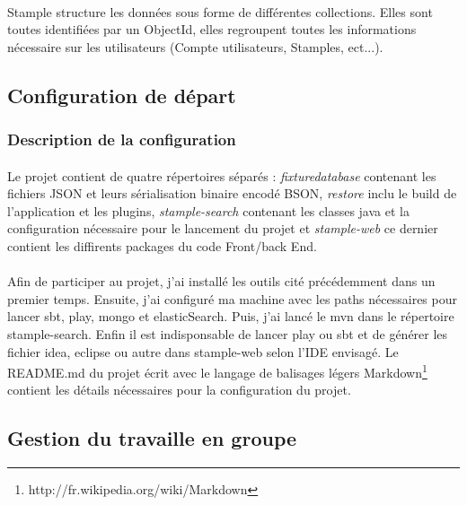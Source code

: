 \paragraph{}
Stample structure les données sous forme de différentes collections.
Elles sont toutes identifiées par un ObjectId, elles regroupent toutes les informations nécessaire sur les utilisateurs (Compte utilisateurs, Stamples, ect...).
\newpage
\subsection{Configuration de départ}
\subsubsection{Description de la configuration}
\paragraph{}
Le projet contient de quatre répertoires séparés : \textit{fixturedatabase} contenant les fichiers JSON et leurs sérialisation binaire encodé BSON, \textit{restore} inclu le build de l'application et les plugins, \textit{stample-search} contenant les classes java et la configuration nécessaire pour le lancement du projet et \textit{stample-web} ce dernier contient les diffirents packages du code Front/back End.
\paragraph{}
Afin de participer au projet, j'ai installé les outils cité précédemment dans un premier temps. Ensuite, j'ai configuré ma machine avec les paths nécessaires pour lancer sbt, play, mongo et elasticSearch. Puis, j'ai lancé le mvn dans le répertoire stample-search. Enfin il est indisponsable de lancer play ou sbt et de générer les fichier idea, eclipse ou autre dans stample-web selon l'IDE envisagé.    
Le README.md du projet écrit avec le langage de balisages légers Markdown\footnote{http://fr.wikipedia.org/wiki/Markdown} contient les détails nécessaires pour la configuration du projet.
\subsection{Gestion du travaille en groupe}
